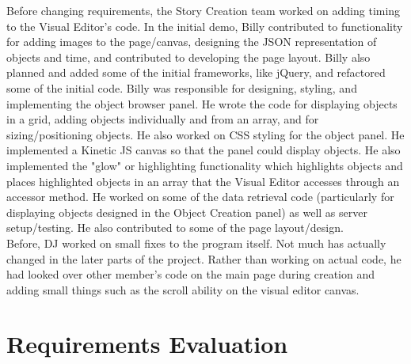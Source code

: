 \documentclass[12pt]{article}
\begin{document}
Before changing requirements, the Story Creation team worked on adding timing to the Visual Editor's code. In the initial demo, Billy contributed to functionality for adding images to the page/canvas, designing the JSON representation of objects and time, and contributed to developing the page layout. Billy also planned and added some of the initial frameworks, like jQuery, and refactored some of the initial code. Billy was responsible for designing, styling, and implementing the object browser panel. He wrote the code for displaying objects in a grid, adding objects individually and from an array, and for sizing/positioning objects. He also worked on CSS styling for the object panel. He implemented a Kinetic JS canvas so that the panel could display objects. He also implemented the "glow" or highlighting functionality which highlights objects and places highlighted objects in an array that the Visual Editor accesses through an accessor method. He worked on some of the data retrieval code (particularly for displaying objects designed in the Object Creation panel) as well as server setup/testing. He also contributed to some of the page layout/design. \\

Before, DJ worked on small fixes to the program itself.  Not much has actually changed in the later parts of the project.  Rather than working on actual code, he had looked over other member's code on the main page during creation and adding small things such as the scroll ability on the visual editor canvas.


\section{Requirements Evaluation}
\end{document}
